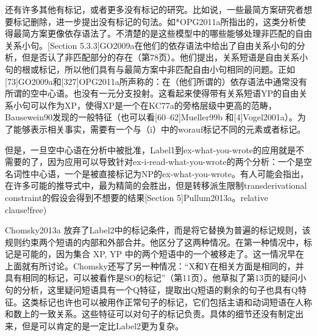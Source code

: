还有许多其他有标记，或者更多没有标记的研究。比如说，一些最简方案研究者想要标记删除，进一步提出没有标记的句法。如*OPG2011a所指出的，这类分析使得最简方案更像依存语法了。不清楚的是这些模型中的哪些能够处理非匹配的自由关系小句。[Section 5.3.3]GO2009a在他们的依存语法中给出了自由关系小句的分析，但是否认了非匹配部分的存在（第78页）。他们提出，关系短语是自由关系小句的根或标记，所以他们具有与最简方案中非匹配自由小句相同的问题。正如[73]GO2009a和[327]OPG2011a所声称的：在（他们所谓的）依存语法中通常没有所谓的空中心语。也没有一元分支投射。这看起来使得带有关系短语YP的自由关系小句可以作为XP，使得XP是一个在KC77a的旁格层级中更高的范畴，Bausewein90发现的一般特征（也可以看[60--62]Mueller99b 和[4]Vogel2001a）。为了能够表示相关事实，需要有一个与（i）中的worauf标记不同的元素或者标记。












 


 
  
 
 
 










但是，一旦空中心语在分析中被批准，Label1到ex-what-you-wrote的应用就是不需要的了，因为应用可以导致针对ex-i-read-what-you-wrote的两个分析：一个是空名词性中心语，一个是被直接标记为NP的ex-what-you-wrote。有人可能会指出，在许多可能的推导式中，最为精简的会胜出，但是转移派生限制transderivational constraint的假设会得到不想要的结果[Section 5]Pullum2013a。relative clause!free)












 








Chomsky2013a 放弃了Label2中的标记条件，而是将它替换为普遍的标记规则，该规则约束两个短语的内部和外部合并。他区分了这两种情况。在第一种情况中，标记是可能的，因为集合 XP, YP 中的两个短语中的一个被移走了。这一情况早在上面就有所讨论。Chomsky还写了另一种情况：“X和Y在相关方面是相同的，并具有相同的标记，可以被看作是SO的标记”（第11页）。他草拟了第13页的疑问小句的分析，这里疑问短语具有一个Q特征，提取出Q短语的剩余的句子也具有Q特征。这类标记也许也可以被用作正常句子的标记，它们包括主语和动词短语在人称和数上的一致关系。这些特征可以对句子的标记负责。具体的细节还没有制定出来，但是可以肯定的是一定比Label2更为复杂。












